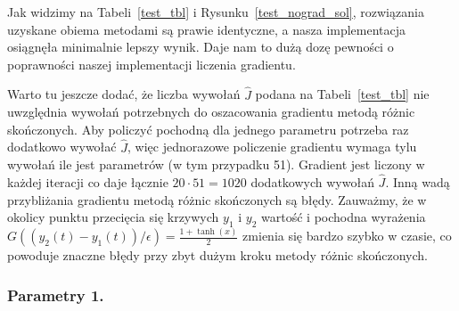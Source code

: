 \documentclass[11pt]{article}
\begin{document}
Jak widzimy na Tabeli~\ref{test_tbl} i Rysunku~\ref{test_nograd_sol}, rozwiązania uzyskane obiema metodami są prawie identyczne, a nasza implementacja osiągnęła minimalnie lepszy wynik. Daje nam to dużą dozę pewności o poprawności naszej implementacji liczenia gradientu.

Warto tu jeszcze dodać, że liczba wywołań $\hat{J}$ podana na Tabeli~\ref{test_tbl} nie uwzględnia wywołań potrzebnych do oszacowania gradientu metodą różnic skończonych. Aby policzyć pochodną dla jednego parametru potrzeba raz dodatkowo wywołać $\hat{J}$, więc jednorazowe policzenie gradientu wymaga tylu wywołań ile jest parametrów (w tym przypadku 51). Gradient jest liczony w każdej iteracji co daje łącznie $20\cdot 51 = 1020$ dodatkowych wywołań $\hat{J}$. Inną wadą przybliżania gradientu metodą różnic skończonych są błędy. Zauważmy, że w okolicy punktu przecięcia się krzywych $y_1$ i $y_2$ wartość i pochodna wyrażenia $G((y_2(t) - y_1(t))/\epsilon) = \frac{1 + \tanh(x)}{2}$ zmienia się bardzo szybko w czasie, co powoduje znaczne błędy przy zbyt dużym kroku metody różnic skończonych.

\subsubsection{Parametry 1.}
\end{document}

